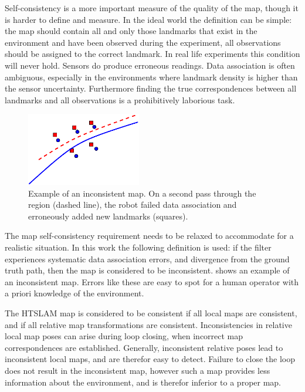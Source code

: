 Self-consistency is a more important measure of the quality of the
map, though it is harder to define and measure. In the ideal world the
definition can be simple: the map should contain all and only those
landmarks that exist in the environment and have been observed during
the experiment, all observations should be assigned to the correct
landmark. In real life experiments this condition will never hold.
Sensors do produce erroneous readings. Data association is often
ambiguous, especially in the environments where landmark density is
higher than the sensor uncertainty. Furthermore finding the true
correspondences between all landmarks and all observations is a
prohibitively laborious task.

\begin{figure}[htbp]
  \centering
  \includegraphics[width=5cm]{Pics/fig_inconsistent_map}
  \caption[Example of an inconsistent map]
  {Example of an inconsistent map. On a second pass through
    the region (dashed line), the robot failed data association and
    erroneously added new landmarks (squares).}
  \label{fig:inconsistent_map}
\end{figure}


The map self-consistency requirement needs to be relaxed to accommodate
for a realistic situation. In this work the following definition is
used: if the filter experiences systematic data association errors,
and divergence from the ground truth path, then the map is considered
to be inconsistent.  shows an example
of an inconsistent map. Errors like these are easy to spot for a human
operator with a priori knowledge of the environment.

The HTSLAM map is considered to be consistent if all local maps are
consistent, and if all relative map transformations are consistent.
Inconsistencies in relative local map poses can arise during loop
closing, when incorrect map correspondences are established.
Generally, inconsistent relative poses lead to inconsistent local
maps, and are therefor easy to detect. Failure to close the loop does
not result in the inconsistent map, however such a map provides less
information about the environment, and is therefor inferior to a
proper map.

